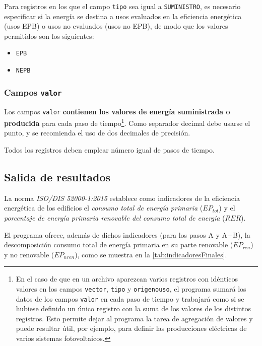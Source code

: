 \documentclass[10pt,notitlepage,oneside,a4paper]{article}
\begin{document}
Para registros en los que el campo \texttt{tipo} sea igual a \texttt{SUMINISTRO}, es necesario especificar si la energía se destina a usos evaluados en la eficiencia energética (usos EPB) o usos no evaluados (usos no EPB), de modo que los valores permitidos son los siguientes:

\begin{itemize}
\item \texttt{EPB}
\item \texttt{NEPB}
\end{itemize}

\subsubsection{Campos \texttt{valor}}

Los campos \texttt{valor} \textbf{contienen los valores de energía suministrada o producida} para cada paso de tiempo\footnote{En el caso de que en un archivo aparezcan varios registros con idénticos valores en los campos \texttt{vector}, \texttt{tipo} y \texttt{origenouso}, el programa sumará los datos de los campos \texttt{valor} en cada paso de tiempo y trabajará como si se hubiese definido un único registro con la suma de los valores de los distintos registros. Esto permite dejar al programa la tarea de agregación de valores y puede resultar útil, por ejemplo, para definir las producciones eléctricas de varios sistemas fotovoltaicos.}. Como separador decimal debe usarse el punto, y se recomienda el uso de dos decimales de precisión.

Todos los registros deben emplear número igual de pasos de tiempo.

\subsection{Salida de resultados}

La norma \textit{ISO/DIS 52000-1:2015} establece como indicadores de la eficiencia energética de los edificios el \textit{consumo total de energía primaria} (\texttt{$EP_{tot}$}) y el \textit{porcentaje de energía primaria renovable del consumo total de energía} (\texttt{$RER$}).

El programa ofrece, además de dichos indicadores (para los pasos A y A+B), la descomposición consumo total de energía primaria en su parte renovable (\texttt{$EP_{ren}$}) y no renovable (\texttt{$EP_{nren}$}), como se muestra en la \autoref{tab:indicadoresFinales}.
\end{document}
